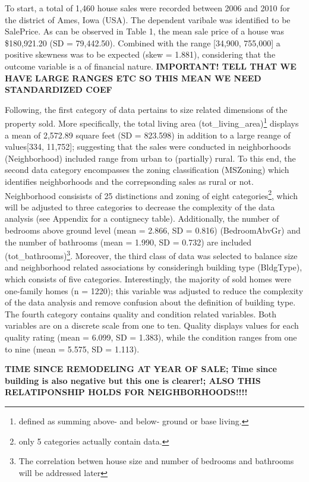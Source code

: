 \documentclass{article}
\begin{document}
To start, a total of 1,460 house sales were recorded between 2006 and 2010 for the district of Ames, Iowa (USA). The dependent varibale was identified to be SalePrice. As can be observed in Table 1, the mean sale price of a house was \$180,921.20 (SD = 79,442.50). Combined with the range [34,900, 755,000] a positive skewness was to be expected (skew = 1.881), considering that the outcome variable is a of financial nature.
\textbf{IMPORTANT! TELL THAT WE HAVE LARGE RANGES ETC SO THIS MEAN WE NEED STANDARDIZED COEF}

\indent Following, the first category of data pertains to size related dimensions of the property sold. More specifically, the total living area (tot\_living\_area)\footnote{defined as summing above- and below- ground or base living.} displays a mean of 2,572.89 square feet (SD = 823.598) in addition to a large reange of values[334, 11,752]; suggesting that the sales were conducted in neighborhoods (Neighborhood) included range from urban to (partially) rural. To this end, the second data category encompasses the zoning classification (MSZoning) which identifies neighborhoods and the correpsonding sales as rural or not. Neighborhood consisists of 25 distinctions and zoning of eight categories\footnote{only 5 categories actually contain data.}, which will be adjusted to three categories to decrease the complexity of the data analysis (see Appendix for a contignecy table). Additionally, the number of bedrooms above ground level (mean = 2.866, SD = 0.816) (BedroomAbvGr) and the number of bathrooms (mean = 1.990, SD = 0.732) are included (tot\_bathrooms)\footnote{The correlation betwen house size and number of bedrooms and bathrooms will be addressed later}. 
\indent Moreover, the third class of data was selected to balance size and neighborhood related associations by consideringh building type (BldgType), which consists of five categories. Interestingly, the majority of sold homes were one-family homes (n = 1220); this variable was adjusted to reduce the complexity of the data analysis and remove confusion about the definition of building type.
\indent The fourth category contains quality and condition related variables. Both variables are on a discrete  scale from one to ten. Quality displays values for each quality rating (mean = 6.099, SD = 1.383), while the condition ranges from one to nine (mean = 5.575, SD = 1.113).

\textbf{TIME SINCE REMODELING AT YEAR OF SALE; Time since building is also negative but this one is clearer!; ALSO THIS RELATIPONSHIP HOLDS FOR NEIGHBORHOODS!!!!}
 
\end{document}
